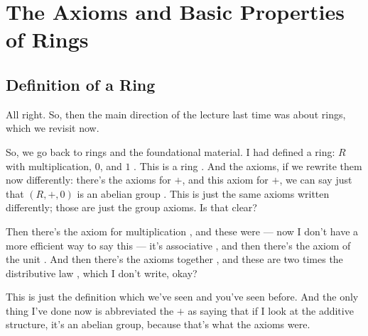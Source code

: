 \begin{hidden}
\end{hidden}

\section{The Axioms and Basic Properties of Rings}
\subsection{Definition of a Ring}

\begin{speech}[00:08:15 - 00:09:45]
All right. So, then the main direction of the lecture last time was about rings, which we revisit now.

So, we go back to rings and the foundational material. I had defined a ring: $R$ with multiplication, $0$, and $1$ . This is a ring . And the axioms, if we rewrite them now differently: there's the axioms for $+$, and this axiom for $+$, we can say just that $(R, +, 0)$ is an abelian group . This is just the same axioms written differently; those are just the group axioms. Is that clear?

Then there's the axiom for multiplication , and these were --- now I don't have a more efficient way to say this --- it's associative , and then there's the axiom of the unit . And then there's the axioms together , and these are two times the distributive law , which I don't write, okay?

This is just the definition which we've seen and you've seen before. And the only thing I've done now is abbreviated the $+$ as saying that if I look at the additive structure, it's an abelian group, because that's what the axioms were.
\end{speech}

